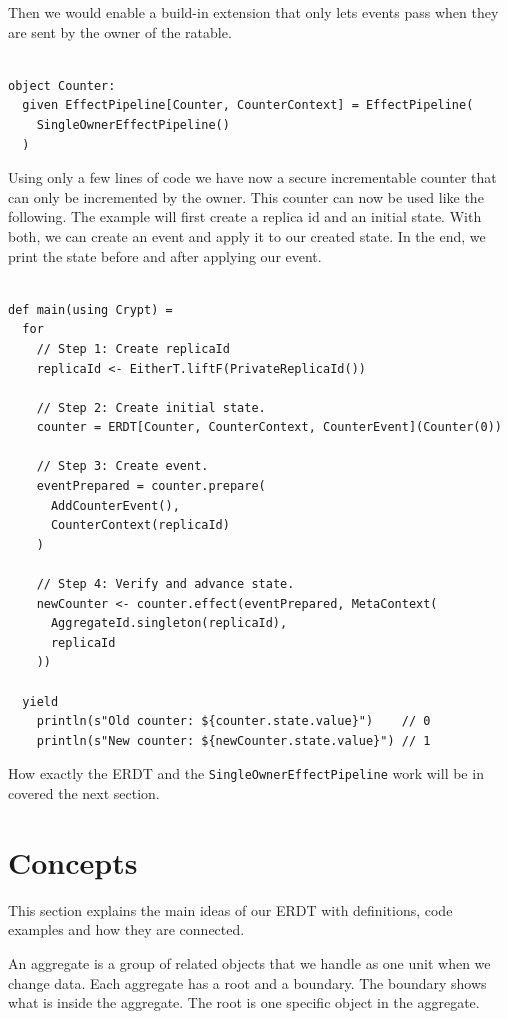 \documentclass[
	english,
	ruledheaders=section,   %
	class=report,		    %
	thesis={type=bachelor}, %
	accentcolor=9c,			%
	custommargins=true,    %
	marginpar=false,        %
	parskip=half-,          %
	fontsize=11pt,          %
]{tudapub}
\begin{document}
Then we would enable a build-in extension that only lets events pass when they are sent by the owner of the ratable.

\begin{lstlisting}

object Counter:
  given EffectPipeline[Counter, CounterContext] = EffectPipeline(
    SingleOwnerEffectPipeline()
  )

\end{lstlisting}

Using only a few lines of code we have now a secure incrementable counter that can only be incremented by the owner. This counter can now be used like the following. The example will first create a replica id and an initial state. With both, we can create an event and apply it to our created state. In the end, we print the state before and after applying our event. 

\begin{lstlisting}
    
def main(using Crypt) = 
  for
    // Step 1: Create replicaId
    replicaId <- EitherT.liftF(PrivateReplicaId())

    // Step 2: Create initial state.
    counter = ERDT[Counter, CounterContext, CounterEvent](Counter(0))

    // Step 3: Create event.
    eventPrepared = counter.prepare(
      AddCounterEvent(),
      CounterContext(replicaId)
    )

    // Step 4: Verify and advance state.
    newCounter <- counter.effect(eventPrepared, MetaContext(
      AggregateId.singleton(replicaId), 
      replicaId
    ))

  yield
    println(s"Old counter: ${counter.state.value}")    // 0
    println(s"New counter: ${newCounter.state.value}") // 1

\end{lstlisting}

How exactly the ERDT and the \texttt{SingleOwnerEffectPipeline} work will be in covered the next section.

\section{Concepts}

This section explains the main ideas of our ERDT with definitions, code examples and how they are connected.


An aggregate is a group of related objects that we handle as one unit when we change data. Each aggregate has a root and a boundary. The boundary shows what is inside the aggregate. The root is one specific object in the aggregate. 
\end{document}
